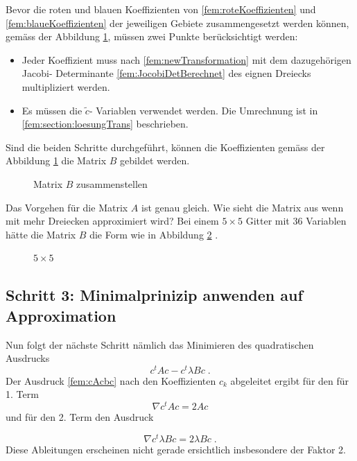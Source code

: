 Bevor die roten und blauen Koeffizienten von \eqref{fem:roteKoeffizienten} und \eqref{fem:blaueKoeffizienten} der jeweiligen Gebiete zusammengesetzt werden können, gemäss der Abbildung \ref{fem:MatrixBKomplett}, müssen zwei Punkte berücksichtigt werden:
\begin{itemize}
	\item Jeder Koeffizient muss nach \eqref{fem:newTransformation} mit dem dazugehörigen Jacobi- Determinante \eqref{fem:JocobiDetBerechnet} des eignen Dreiecks multipliziert werden. 
	\item Es müssen die $\tilde{c}$- Variablen verwendet werden. Die Umrechnung ist in  \ref{fem:section:loesungTrans} beschrieben.
\end{itemize}
Sind die beiden Schritte durchgeführt, können die Koeffizienten gemäss der Abbildung \ref{fem:MatrixBKomplett} die Matrix $B$ gebildet werden.
\begin{figure}[h]
	\centering
	
	\caption{Matrix $B$ zusammenstellen }
	\label{fem:MatrixBKomplett}
\end{figure}
Das Vorgehen für die Matrix $A$ ist genau gleich. Wie sieht die Matrix aus wenn mit mehr Dreiecken approximiert wird? Bei einem $5 \times 5$ Gitter mit 36 Variablen hätte die Matrix $B$ die Form wie in Abbildung \ref{fem:MatrixBGross} .

\begin{figure}[h]
	\centering
	
	\caption{$5 \times 5$}
	\label{fem:MatrixBGross}
\end{figure}


\subsection{Schritt 3: Minimalprinizip anwenden auf Approximation}

Nun folgt der nächste Schritt nämlich das Minimieren des quadratischen Ausdrucks
\begin{equation}
	c^t Ac - c^t \lambda Bc \; .
	\label{fem:cAcbc}
\end{equation}
Der Ausdruck \eqref{fem:cAcbc} nach den Koeffizienten $c_k$ abgeleitet ergibt für den  für 1. Term
\begin{equation}
	\nabla c^t Ac = 2Ac
\end{equation}
und für den 2. Term den Ausdruck

\begin{equation}
	\nabla c^t \lambda Bc = 2\lambda Bc \; .
\end{equation}
Diese Ableitungen erscheinen nicht gerade ersichtlich insbesondere der Faktor 2. \\

